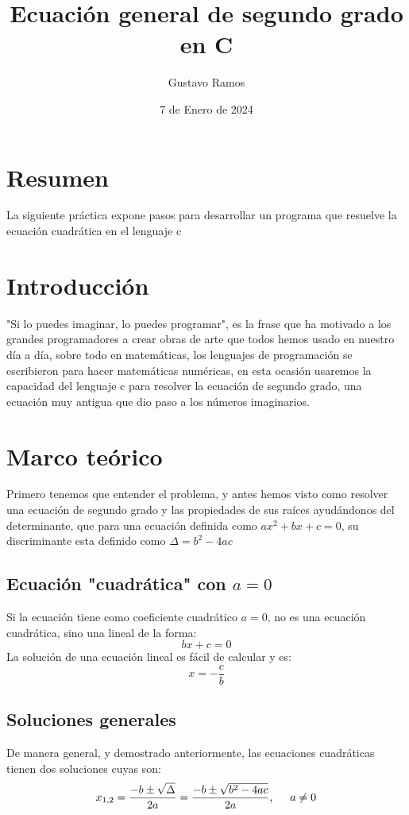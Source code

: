 \documentclass{article}
\title{Ecuación general de segundo grado en C}
\author{Gustavo Ramos}
\date{7 de Enero de 2024}
\begin{document}
	\maketitle
	\begin{multicols}{2}

		\section{Resumen}
			La siguiente práctica expone pasos para desarrollar un programa que resuelve la ecuación cuadrática en el lenguaje c

		\section{Introducción }
			"Si lo puedes imaginar, lo puedes programar", es la frase que ha motivado a los grandes programadores a
			crear obras de arte que todos hemos usado en nuestro día a día, sobre todo en matemáticas, los lenguajes de
			programación se escribieron para hacer matemáticas numéricas, en esta ocasión usaremos la capacidad del
			lenguaje c para resolver la ecuación de segundo grado, una ecuación muy antigua que dio paso a los números
			imaginarios.

		\section{Marco teórico }
			Primero tenemos que entender el problema, y antes hemos visto como resolver una ecuación de segundo
			grado y las propiedades de sus raíces ayudándonos del determinante, que para una ecuación definida como
			$ax^2+bx+c=0$, su discriminante esta definido como $\Delta=b^2-4ac$

		\subsection{Ecuación "cuadrática" con $a=0$ }
			Si la ecuación tiene como coeficiente cuadrático $a=0$, no es una ecuación cuadrática, sino una lineal
			de la forma: 
			$$bx+c=0$$
			La solución de una ecuación lineal es fácil de calcular y es:
			$$x=-\frac{c}{b}$$

		\subsection{Soluciones generales}
			De manera general, y demostrado anteriormente, las ecuaciones cuadráticas tienen dos soluciones cuyas son:
			$$x_{1,2}=\frac{-b\pm\sqrt{\Delta}}{2a}=\frac{-b\pm\sqrt{b^2-4ac}}{2a},\hspace{0.5cm}a\neq0$$


\end{multicols}
\end{document}
